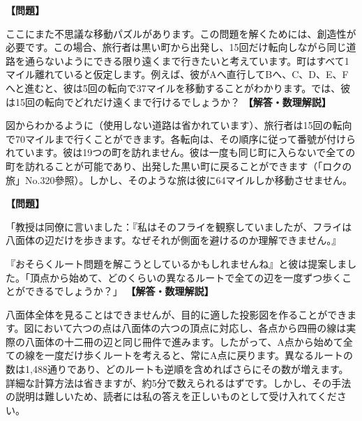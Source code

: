 \documentclass[10pt,a4paper,oneside,openany]{ltjsbook}
\begin{document}
\begin{tcolorbox}[colback=softblue,colframe=primaryblue,title=\textbf{第 244 問：十五回転の旅 （原題: THE FIFTEEN TURNINGS.）},arc=2mm,boxrule=1pt,breakable]
\textbf{【問題】}\par\vspace{0.3em}
ここにまた不思議な移動パズルがあります。この問題を解くためには、創造性が必要です。この場合、旅行者は黒い町から出発し、15回だけ転向しながら同じ道路を通らないようにできる限り遠くまで行きたいと考えています。町はすべて1マイル離れていると仮定します。例えば、彼がAへ直行してBへ、C、D、E、Fへと進むと、彼は5回の転向で37マイルを移動することがわかります。では、彼は15回の転向でどれだけ遠くまで行けるでしょうか？
\tcblower
\textbf{【解答・数理解説】}\par\vspace{0.3em}
図からわかるように（使用しない道路は省かれています）、旅行者は15回の転向で70マイルまで行くことができます。各転向は、その順序に従って番號が付けられています。彼は19つの町を訪れません。彼は一度も同じ町に入らないで全ての町を訪れることが可能であり、出発した黒い町に戻ることができます（「ロクの旅」No.320參照）。しかし、そのような旅は彼に64マイルしか移動させません。
\end{tcolorbox}

\begin{tcolorbox}[colback=softblue,colframe=primaryblue,title=\textbf{第 245 問：八面体上のフライ （原題: THE FLY ON THE OCTAHEDRON.）},arc=2mm,boxrule=1pt,breakable]
\textbf{【問題】}\par\vspace{0.3em}
「教授は同僚に言いました：『私はそのフライを観察していましたが、フライは八面体の辺だけを歩きます。なぜそれが側面を避けるのか理解できません。』

『おそらくルート問題を解こうとしているかもしれませんね』と彼は提案しました。「頂点から始めて、どのくらいの異なるルートで全ての辺を一度ずつ歩くことができるでしょうか？」
\tcblower
\textbf{【解答・数理解説】}\par\vspace{0.3em}
八面体全体を見ることはできませんが、目的に適した投影図を作ることができます。図において六つの点は八面体の六つの頂点に対応し、各点から四冊の線は実際の八面体の十二冊の辺と同じ冊件で進みます。したがって、A点から始めて全ての線を一度だけ歩くルートを考えると、常にA点に戻ります。異なるルートの数は1,488通りであり、どのルートも逆順を含めればさらにその数が増えます。詳細な計算方法は省きますが、約5分で数えられるはずです。しかし、その手法の説明は難しいため、読者には私の答えを正しいものとして受け入れてください。
\end{tcolorbox}
\end{document}
